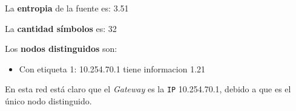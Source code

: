 La \textbf{entropia} de la fuente es: 3.51

La \textbf{cantidad símbolos} es: 32

Los \textbf{nodos distinguidos} son:

\begin{itemize}
    \item Con etiqueta 1: 10.254.70.1 tiene informacion 1.21
\end{itemize}

En esta red está claro que el \textit{Gateway} es la \texttt{IP} 10.254.70.1, debido a que
es el único nodo distinguido.
